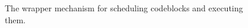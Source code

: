 %
%
%

\begin{figure}

\caption{The wrapper mechanism for scheduling codeblocks and executing them.}
\label{fig:asyncwrapper:short}
\end{figure}

